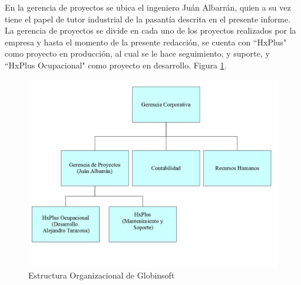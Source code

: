     En la gerencia de proyectos se ubica el ingeniero Juán Albarrán, quien a su vez tiene el papel de tutor industrial de la pasantía descrita en el presente informe. La gerencia de proyectos se divide en cada uno de los proyectos realizados por la empresa y hasta el momento de la presente redacción, se cuenta con ``HxPlus" como proyecto en producción, al cual se le hace seguimiento, y suporte, y ``HxPlus Ocupacional" como proyecto en desarrollo. Figura \ref{estructura-org}.
    
    \begin{figure}[htbp!]
        \begin{center}
            \includegraphics[width=.8\textwidth]{figures/Estructura}
        \end{center}
        \caption{Estructura Organizacional de Globinsoft}
        \label{estructura-org}
    \end{figure}

\pagebreak